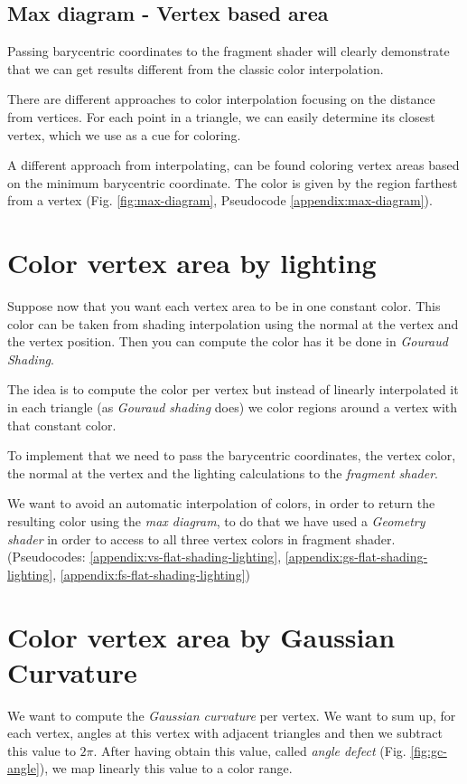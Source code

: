 \subsection{Max diagram - Vertex based area} \label{section:max-diagram}
Passing barycentric coordinates to the fragment shader will clearly demonstrate that we can get results different from the classic color interpolation.

There are different approaches to color interpolation focusing on the distance from vertices. For each point in a triangle, we can easily determine its closest vertex, which we use as a cue for coloring.

A different approach from interpolating, can be found coloring vertex areas based on the minimum barycentric coordinate.
The color is given by the region farthest from a vertex (Fig. \ref{fig:max-diagram}, Pseudocode \ref{appendix:max-diagram}).


\section{Color vertex area by lighting} \label{section:extend-flat-shading-lighting}
Suppose now that you want each vertex area to be in one constant color. This color can be taken from shading interpolation using the normal at the vertex and the vertex position. Then you can compute the color has it be done in \textit{Gouraud Shading}.

The idea is to compute the color per vertex but instead of linearly interpolated it in each triangle (as \textit{Gouraud shading} does) we color regions around a vertex with that constant color.

To implement that we need to pass the barycentric coordinates, the vertex color, the normal at the vertex and the lighting calculations to the \textit{fragment shader}.

We want to avoid an automatic interpolation of colors, in order to return the resulting color using the \textit{max diagram}, to do that we have used a \textit{Geometry shader} in order to access to all three vertex colors in fragment shader. (Pseudocodes: \ref{appendix:vs-flat-shading-lighting}, \ref{appendix:gs-flat-shading-lighting}, \ref{appendix:fs-flat-shading-lighting})
\section{Color vertex area by Gaussian Curvature}\label{extend-flat-gaussian-curvature}
We want to compute the \textit{Gaussian curvature} per vertex. We want to sum up, for each vertex, angles at this vertex with adjacent triangles and then we subtract this value to $2\pi$.
After having obtain this value, called \textit{angle defect} (Fig. \ref{fig:gc-angle}), we map linearly this value to a color range.

